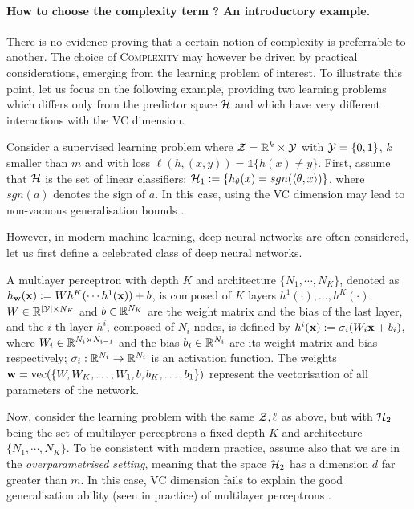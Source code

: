 \paragraph{How to choose the complexity term ? An introductory example.} There is no evidence proving that a certain notion of complexity is preferrable to another. The choice of \textsc{Complexity} may however be driven by practical considerations, emerging from the learning problem of interest. To illustrate this point, let us focus on the following example, providing two learning problems which differs only from the predictor space $\mathcal{H}$ and which have very different interactions with the VC dimension.
\begin{example}
  \label{ex: neural_net}
  Consider a supervised learning problem where $\mathcal{Z} = \mathbb{R}^k\times\mathcal{Y}$ with $\mathcal{Y}=\{0,1\}$, $k$ smaller than $m$ and with loss $\ell(h,(x,y))= \mathds{1}\{h(x) \neq y\}$.  First, assume that $\mathcal{H}$ is the set of linear classifiers; \ie $\mathcal{H}_1:= \left\{ h_{\theta}(x)= sgn(\langle \theta,x\rangle)  \right\}$, where $sgn(a)$ denotes the sign of $a$. In this case, using the VC dimension may lead to non-vacuous generalisation bounds \citep{vapnik2000learning}. 

However, in modern machine learning, deep neural networks are often considered, let us first define a celebrated class of deep neural networks. 

\begin{definition}
    \label{def:mlp}
    A multlayer perceptron with depth $K$ and architecture $\{N_1,\cdots,N_K\}$, denoted as $h_{\mathbf{w}}(\mathbf{x}) := Wh^{K}(\cdots h^{1}(\mathbf{x}))+b$, is composed of $K$ layers $h^1(\cdot),\dots,h^K(\cdot)$.
 $W\in\mathbb{R}^{|\mathcal{Y}|\times N_K}$ and $b\in\mathbb{R}^{N_K}$ are the weight matrix and the bias of the last layer, and the $i$-th layer $h^{i}$, composed of $N_i$ nodes, is defined by $h^{i}(\mathbf{x}):=\sigma_i(W_i \mathbf{x} + b_i)$, where $W_i\in\mathbb{R}^{N_i\times N_{i-1}}$ and the bias $b_i\in \mathbb{R}^{N_i}$ are its weight matrix and bias respectively; $\sigma_i : \mathbb{R}^{N_i} \to \mathbb{R}^{N_i} $ is an activation function.
The weights $\mathbf{w}=\operatorname*{\mathrm{vec}}(\{W, W_{K}, \dots, W_1, b, b_{K}, \dots, b_1\})$ represent the vectorisation of all parameters of the network.
\end{definition}
Now, consider the learning problem with the same $\mathcal{Z},\ell$ as above, but with $\mathcal{H}_2$ being the set of multilayer perceptrons \wrt a fixed depth $K$ and architecture $\{N_1,\cdots,N_K\}$. To be consistent with modern practice, assume also that we are in the \emph{overparametrised setting}, meaning that the space $\mathcal{H}_2$ has a dimension $d$ far greater than $m$.
In this case, VC dimension fails to explain the good generalisation ability (seen in practice) of multilayer perceptrons \citep{bartlett2003vapnik}.
\end{example}

